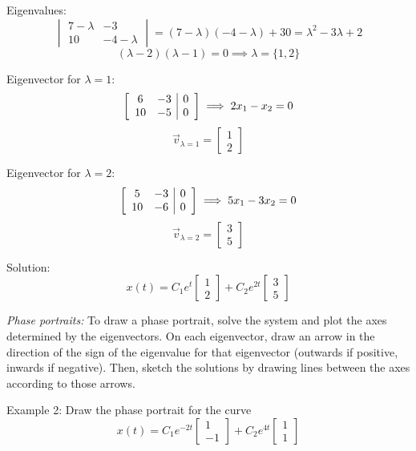 \documentclass[12pt]{article}
\begin{document}
Eigenvalues:
\[\begin{vmatrix}
    7 - \lambda & -3\\
    10 & -4 - \lambda
\end{vmatrix} = (7- \lambda)(-4-\lambda) +30 = \lambda^2 - 3\lambda + 2\]
\[(\lambda - 2)(\lambda - 1) = 0 \implies \lambda = \{1, 2\}\]

Eigenvector for $\lambda = 1$:
\[\left[\begin{array}{c c | c}
    6 & -3 & 0\\
    10 & -5 & 0
\end{array} \right]\implies 2x_1 - x_2 = 0\]
\[\vec{v}_{\lambda = 1} = \begin{bmatrix}
    1\\
    2
\end{bmatrix}\]

Eigenvector for $\lambda = 2$:
\[\left[\begin{array}{c c | c}
    5 & -3 & 0\\
    10 & -6 & 0
\end{array}\right] \implies 5x_1 - 3x_2 = 0\]
\[\vec{v}_{\lambda = 2} = \begin{bmatrix}
    3\\
    5
\end{bmatrix}\]

Solution:
\[\boxed{x(t) = C_1 e^{t} \begin{bmatrix}
    1\\2
\end{bmatrix} + C_2 e^{2t} \begin{bmatrix}
    3\\5
\end{bmatrix}}\]

\emph{Phase portraits:}
To draw a phase portrait, solve the system and plot the axes determined by the eigenvectors. On each eigenvector, draw an arrow in the direction of the sign of the eigenvalue for that eigenvector (outwards if positive, inwards if negative). Then, sketch the solutions by drawing lines between the axes according to those arrows.

Example 2: Draw the phase portrait for the curve 
\[x(t) = C_1 e^{-2t} \begin{bmatrix}
    1\\-1
\end{bmatrix}+ C_2 e^{4t} \begin{bmatrix}
    1\\1
\end{bmatrix}\]
\end{document}
